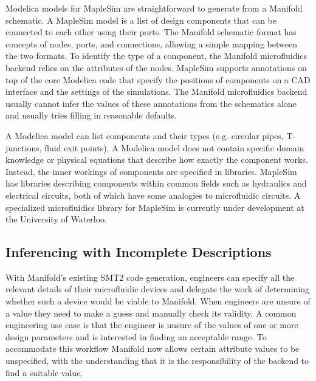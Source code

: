 Modelica models for MapleSim are straightforward to generate from a Manifold schematic.
A MapleSim model is a list of design components that can be connected to each other using their ports.
The Manifold schematic format has concepts of nodes, ports, and connections, allowing a simple mapping between the two formats.
To identify the type of a component, the Manifold microfluidics backend relies on the attributes of the nodes.
MapleSim supports annotations on top of the core Modelica code that specify the positions of components on a CAD interface and the settings of the simulations.
The Manifold microfluidics backend usually cannot infer the values of these annotations from the schematics alone and usually tries filling in reasonable defaults.

A Modelica model can list components and their types (e.g. circular pipes, T-junctions, fluid exit points).
A Modelica model does not contain specific domain knowledge or physical equations that describe how exactly the component works.
Instead, the inner workings of components are specified in libraries.
MapleSim has libraries describing components within common fields such as hydraulics and electrical circuits, both of which have some analogies to microfluidic circuits.
A specialized microfluidics library for MapleSim is currently under development at the University of Waterloo.

\subsection{Inferencing with Incomplete Descriptions}

With Manifold's existing SMT2 code generation, engineers can specify all the
relevant details of their microfluidic devices and delegate the work of
determining whether such a device would be viable to Manifold. When engineers
are unsure of a value they need to make a guess and manually check its
validity. A common engineering use case is that the engineer is unsure of the
values of one or more design parameters and is interested in finding an
acceptable range. To accommodate this workflow Manifold now allows certain
attribute values to be unspecified, with the understanding that it is the
responsibility of the backend to find a suitable value.

